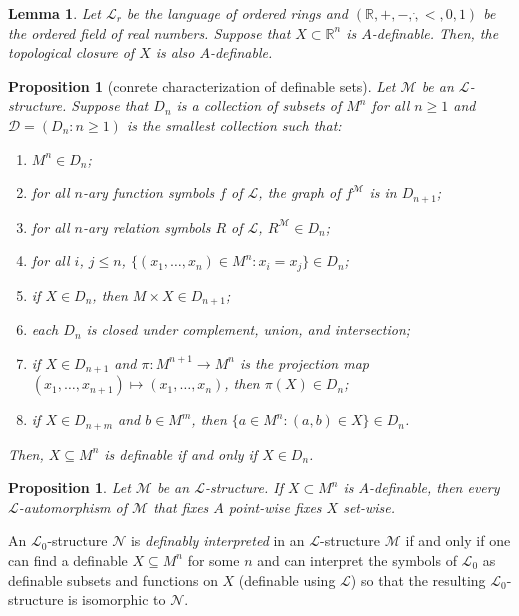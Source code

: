 \documentclass{amsart}
\newtheorem{lemma}[theorem]{Lemma}
\newtheorem{proposition}[theorem]{Proposition}
\theoremstyle{definition}
\numberwithin{equation}{section}
\begin{document}
\begin{lemma}
    Let $\mathcal{L}_r$ be the language of ordered rings and 
    $(\mathbb{R}, +, -, \dot, <, 0, 1)$ be the ordered field of real numbers.
    Suppose that $X \subset \mathbb{R}^n$ is $A$-definable.
    Then, the topological closure of $X$ is also $A$-definable.
\end{lemma}

\begin{proposition}[conrete characterization of definable sets]
    Let $\mathcal{M}$ be an $\mathcal{L}$-structure.
    Suppose that $D_n$ is a collection of subsets of $M^n$ for all $n \ge 1$ and 
    $\mathcal{D} = (D_n : n \ge 1)$ is the smallest collection such that:
    \begin{enumerate}[label = {\roman*)}]
        \item $M^n \in D_n$;
        \item for all $n$-ary function symbols $f$ of $\mathcal{L}$, the graph of $f^{\mathcal{M}}$ is in $D_{n+1}$;
        \item for all $n$-ary relation symbols $R$ of $\mathcal{L}$, $R^{\mathcal{M}} \in D_n$;
        \item for all $i$, $j\le n$, $\{(x_1,\dots,x_n)\in M^n : x_i = x_j\} \in D_n$;
        \item if $X \in D_n$, then $M \times X \in D_{n+1}$;
        \item each $D_n$ is closed under complement, union, and intersection;
        \item if $X \in D_{n+1}$ and $\pi: M^{n+1} \to M^n$ is the projection map $(x_1,\dots,x_{n+1}) \mapsto (x_1,\dots,x_n)$, then $\pi(X) \in D_n$;
        \item if $X \in D_{n+m}$ and $b \in M^m$, then $\{a\in M^n: (a,b) \in X \} \in D_n$.
    \end{enumerate}
    Then, $X \subseteq M^n$ is definable if and only if $X \in D_n$.
\end{proposition}

\begin{proposition}
    Let $\mathcal{M}$ be an $\mathcal{L}$-structure.
    If $X \subset M^n$ is $A$-definable,
    then every $\mathcal{L}$-automorphism of $\mathcal{M}$ that fixes $A$ point-wise fixes $X$ set-wise.
\end{proposition}

An $\mathcal{L}_0$-structure $\mathcal{N}$ is \emph{definably interpreted} in an $\mathcal{L}$-structure $\mathcal{M}$ 
if and only if one can find a definable $X \subseteq M^n$ for some $n$ and can interpret the symbols of $\mathcal{L}_0$ as definable subsets and functions on $X$ (definable using $\mathcal{L}$) so that the resulting $\mathcal{L}_0$-structure is isomorphic to $\mathcal{N}$.
\end{document}
